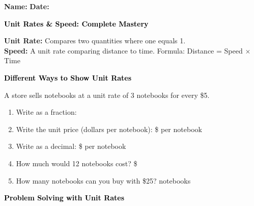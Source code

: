 \documentclass[12pt, letterpaper, fleqn]{article}
\newcommand{\blank}{\underline{\hspace{2.2cm}}}
\newcommand{\blankshorter}{\underline{\hspace{1.5cm}}}
\begin{document}
\textbf{Name:} \underline{\hspace{5cm}}
\hfill
\textbf{Date:} \underline{\hspace{3cm}}\\

\begin{tcolorbox}[colback=customteal!20]
    \large\textcolor{black}{\textbf{Unit Rates \& Speed: Complete Mastery}}
\end{tcolorbox}

\vspace{3mm}

\noindent
\textbf{Unit Rate:} Compares two quantities where one equals 1. \\
\textbf{Speed:} A unit rate comparing distance to time. Formula: Distance = Speed $\times$ Time

\vspace{4mm}

\begin{tcolorbox}[colback=customteal!20]
\large\textcolor{black}{\textbf{Different Ways to Show Unit Rates}}
\end{tcolorbox}

\noindent
A store sells notebooks at a unit rate of 3 notebooks for every \$5.

\vspace{3mm}

\begin{enumerate}[itemsep=2cm, leftmargin=0.6cm]
\item Write as a fraction: \blank

\item Write the unit price (dollars per notebook): \$ \blankshorter \; per notebook

\item Write as a decimal: \$ \blank \; per notebook

\item How much would 12 notebooks cost? \$ \blank

\item How many notebooks can you buy with \$25? \blank \; notebooks
\end{enumerate}

\newpage

\begin{tcolorbox}[colback=customteal!20]
\large\textcolor{black}{\textbf{Problem Solving with Unit Rates}}
\end{tcolorbox}
\end{document}
